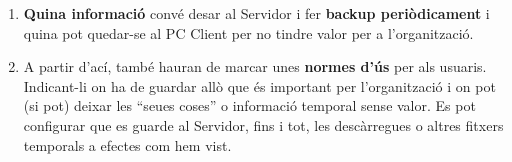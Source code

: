 \documentclass[
  a4paper,
]{article}
\begin{document}
\begin{enumerate}
\def\labelenumi{\arabic{enumi}.}
\item
  \textbf{Quina informació} convé desar al Servidor i fer \textbf{backup
  periòdicament} i quina pot quedar-se al PC Client per no tindre valor
  per a l'organització.
\item
  A partir d'ací, també hauran de marcar unes \textbf{normes d'ús} per
  als usuaris. Indicant-li on ha de guardar allò que és important per
  l'organització i on pot (si pot) deixar les ``seues coses'' o
  informació temporal sense valor. Es pot configurar que es guarde al
  Servidor, fins i tot, les descàrregues o altres fitxers temporals a
  efectes com hem vist.
\end{enumerate}
\end{document}
